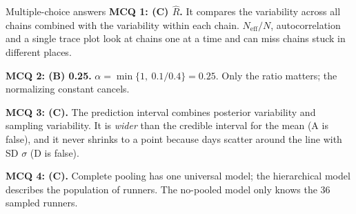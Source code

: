 \documentclass[aspectratio=43,11pt]{beamer}
\begin{document}
\begin{frame}{Multiple-choice answers}
  \small
  \textbf{MCQ 1: (C) $\hat R$.} It compares the variability across all
  chains combined with the variability within each chain.
  $N_{\text{eff}}/N$, autocorrelation and a single trace plot look at
  chains one at a time and can miss chains stuck in different places.
  \vspace{0.5em}

  \textbf{MCQ 2: (B) 0.25.} $\alpha = \min\{1,\ 0.1/0.4\} = 0.25$.
  Only the ratio matters; the normalizing constant cancels.
  \vspace{0.5em}

  \textbf{MCQ 3: (C).} The prediction interval combines posterior
  variability and sampling variability. It is \emph{wider} than the
  credible interval for the mean (A is false), and it never shrinks to a
  point because days scatter around the line with SD $\sigma$ (D is
  false).
  \vspace{0.5em}

  \textbf{MCQ 4: (C).} Complete pooling has one universal model;
  the hierarchical model describes the population of runners. The
  no-pooled model only knows the 36 sampled runners.
\end{frame}
\end{document}
